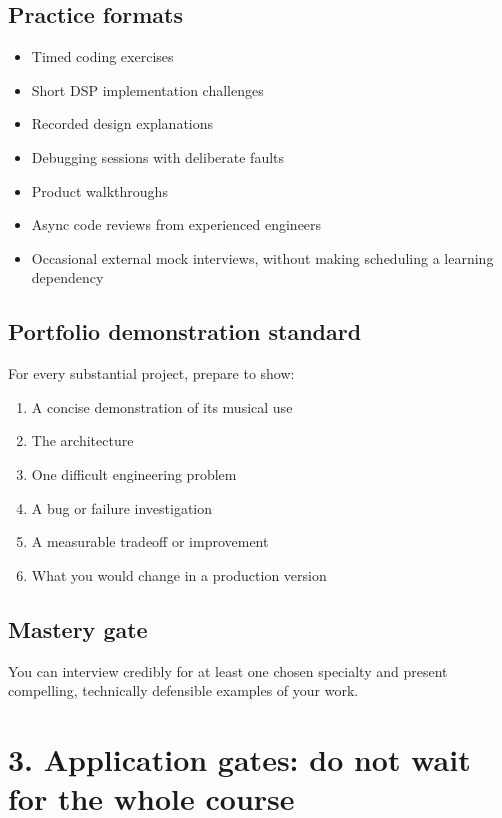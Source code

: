 \documentclass[11pt,letterpaper]{article}
\begin{document}
\subsection*{Practice formats}\label{practice-formats}

\begin{itemize}
\item Timed coding exercises
\item Short DSP implementation challenges
\item Recorded design explanations
\item Debugging sessions with deliberate faults
\item Product walkthroughs
\item Async code reviews from experienced engineers
\item Occasional external mock interviews, without making scheduling a learning dependency
\end{itemize}

\subsection*{Portfolio demonstration standard}\label{portfolio-demonstration-standard}

For every substantial project, prepare to show:

\begin{enumerate}
\item A concise demonstration of its musical use
\item The architecture
\item One difficult engineering problem
\item A bug or failure investigation
\item A measurable tradeoff or improvement
\item What you would change in a production version
\end{enumerate}

\subsection*{Mastery gate}\label{mastery-gate-12}

You can interview credibly for at least one chosen specialty and present compelling, technically defensible examples of your work.

\clearpage

\section{3. Application gates: do not wait for the whole course}\label{application-gates-do-not-wait-for-the-whole-course}
\end{document}
